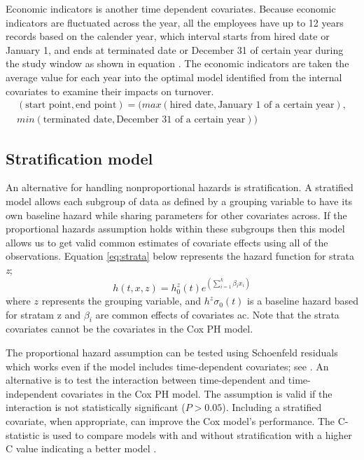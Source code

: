 \documentclass[12pt,letterpaper]{article}
\begin{document}
Economic indicators is another time dependent covariates. Because economic indicators are fluctuated across the year, all the employees have up to 12 years records based on the calender year, which interval starts from hired date or January 1, and ends at terminated date or December 31 of certain year during the study window as shown in equation . The economic indicators are taken the average value for each year into the optimal model identified from the internal covariates to examine their impacts on turnover.
\begin{equation}
\label{eq:interval}
\begin{split}
(\text{start point}, \text{end point})= (max(\text{hired date}, \text{January 1 of a certain year}),\\
                                        min(\text{terminated date}, \text{December 31 of a certain year}))
\end{split}
\end{equation}

\subsection{Stratification model}
An alternative for handling nonproportional hazards is stratification.  A stratified model allows each subgroup of data as defined by a grouping variable to have its own baseline hazard while sharing parameters for other covariates across. If the proportional hazards assumption holds within these subgroups then this model allows us to get valid common estimates of covariate effects using all of the observations. Equation \ref{eq:strata} below represents the hazard function for strata {\it z}; 
\begin{equation}
	\label{eq:strata}
	h(t,x,z)=h^z_0(t)e^{(\sum_{i=1}^{k}\beta_ix_i)}
\end{equation}
where $z$ represents the grouping variable, and $h^z\sigma_0(t)$ is a baseline hazard based for stratam z and $\beta_i$ are common effects of covariates ac. Note that the strata covariates cannot be the covariates in the Cox PH model.

The proportional hazard assumption can be tested using Schoenfeld residuals which works even if the model includes time-dependent covariates; see \citet{allison2010,collett1994}. An alternative is to test the interaction between time-dependent and time-independent covariates in the Cox PH model. The assumption is valid if the interaction is not statistically significant ($P>0.05$).  Including a stratified covariate, when appropriate, can improve the Cox model's performance.  The C-statistic is used to compare models with and without stratification with a higher C value indicating a better model \citep{lemke2012}.
\end{document}
